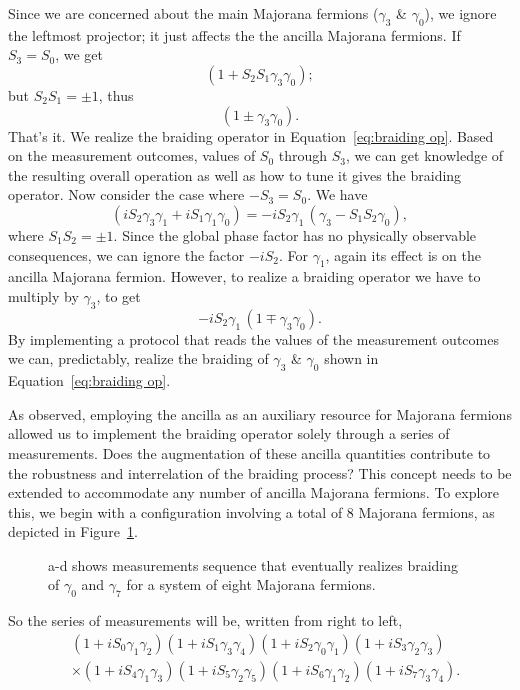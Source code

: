 \documentclass{article}
\begin{document}
Since we are concerned about the main Majorana fermions ($ \gamma_3 $ \& $ \gamma_0 $), we ignore the leftmost projector; it just affects the the ancilla Majorana fermions.
If $ S_3 = S_0 $, we get
\[
	( 1 + S_2 S_1 \gamma_3 \gamma_0 );
\]
but $ S_2 S_1 = \pm 1 $, thus
\[
	( 1 \pm \gamma_3 \gamma_0 ).
\]
That's it. We realize the braiding operator in Equation~\ref{eq:braiding op}. Based on the measurement outcomes, values of $ S_0 $ through $ S_3 $, we can get knowledge of the resulting overall operation as well as how to tune it gives the braiding operator. Now consider the case where $ -S_3 = S_0 $. We have
\[
	( iS_2 \gamma_3 \gamma_1 +iS_1 \gamma_1 \gamma_0)
	= -i S_2 \gamma_1\, ( \gamma_3 - S_1 S_2 \gamma_0) ,
\]
where $ S_1 S_2 = \pm 1 $. Since the global phase factor has no physically observable consequences, we can ignore the factor $ -iS_2 $. For $ \gamma_1 $, again its effect is on the ancilla Majorana fermion. However, to realize a braiding operator we have to multiply by $ \gamma_3 $, to get
\[
	-iS_2 \gamma_1\, (1 \mp \gamma_3 \gamma_0).
\]
By implementing a protocol that reads the values of the measurement outcomes we can, predictably, realize the braiding of $ \gamma_3 $ \& $ \gamma_0 $ shown in Equation~\ref{eq:braiding op}.

\vspace{12pt}
As observed, employing the ancilla as an auxiliary resource for Majorana fermions allowed us to implement the braiding operator solely through a series of measurements. Does the augmentation of these ancilla quantities contribute to the robustness and interrelation of the braiding process? This concept needs to be extended to accommodate any number of ancilla Majorana fermions. To explore this, we begin with a configuration involving a total of 8 Majorana fermions, as depicted in Figure~\ref{fig:8-conf-meas}.
\begin{figure}
	\begin{center}
		
	\end{center}
	\caption{a-d shows measurements sequence that eventually realizes braiding of $ \gamma_0 $ and $ \gamma_7 $ for a system of eight Majorana fermions.}
	\label{fig:8-conf-meas}
\end{figure}
So the series of measurements will be, written from right to left,
\begin{equation}
	\begin{aligned}
		 & (1+ i S_0 \gamma_1 \gamma_2)(1+ i S_1 \gamma_3 \gamma_4)(1+ i S_2 \gamma_0 \gamma_1) (1+ i S_3 \gamma_2 \gamma_3)         \\
		 & \times (1+ i S_4 \gamma_1 \gamma_3)(1+ i S_5 \gamma_2 \gamma_5)(1+ i S_6 \gamma_1 \gamma_2)(1+ i S_7 \gamma_3 \gamma_4) .
	\end{aligned}
	\label{eq:meas seq 8 mfs}
\end{equation}
\end{document}
